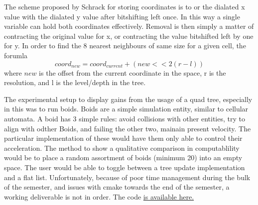\documentclass{article}
\begin{document}
The scheme proposed by Schrack for storing coordinates is to or the dialated x
value with the dialated y value after bitshifting left once. In this way a single 
variable can hold both coordinates effectively. Removal is then simply a matter
of contracting the original value for x, or contracting the value bitshifted left by
one for y. 
In order to find the 8 nearest neighbours of same size for a given cell, the forumla
\[ coord_{new} = coord_{current} + (new << 2(r-l)) \] where $new$ is the offset from the
current coordinate in the space, r is the resolution, and l is the level/depth in the tree.

The experimental setup to display gains from the usage of a quad tree, especially in this 
was to run boids.
Boids are a simple simulation entity, similar to cellular automata. 
A boid has 3 simple rules: avoid collisions with other entities, try to align with odther 
Boids, and failing the other two, mainain present velocity. 
The particular implementation of these would have them only able to control their acceleration.
The method to show a qualitative comparison in computablility would be to place a random
assortment of boids (minimum 20) into an empty space. 
The user would be able to toggle between a tree update implementation and a flat list.
Unfortunately, because of poor time management during the bulk of the semester, and
issues with cmake towards the end of the semester, a working deliverable is not in order.
The code \href{https://github.com/teddy2021/Master-s/tree/ComputationalGeometry/Project}{is available here.}


\end{document}
